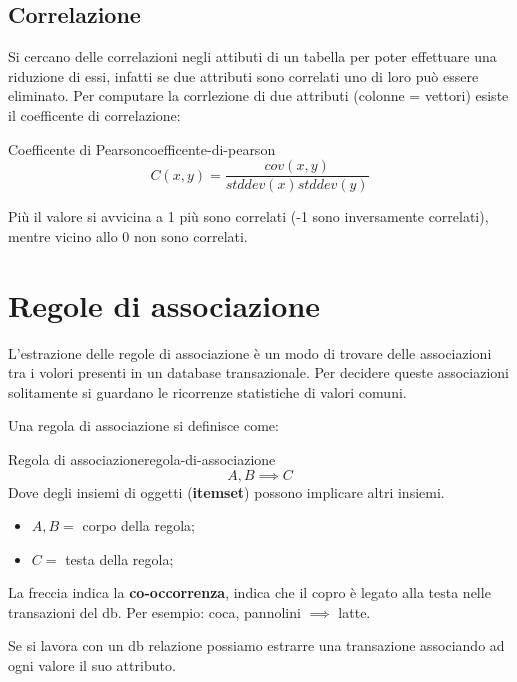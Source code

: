 \documentclass[12pt]{article}
\begin{document}
\subsection{Correlazione}
Si cercano delle correlazioni negli attibuti di un tabella per poter effettuare una riduzione di essi, infatti se due attributi sono correlati uno di loro pu\`o essere eliminato. Per computare la corrlezione di due attributi (colonne = vettori) esiste il coefficente di correlazione:
\begin{definition}{Coefficente di Pearson}{coefficente-di-pearson}
    \[ C(x, y) = \frac{cov(x, y)}{stddev(x) stddev(y)} \]
\end{definition}
Pi\`u il valore si avvicina a 1 pi\`u sono correlati (-1 sono inversamente correlati), mentre vicino allo 0 non sono correlati.


\newpage
\section{Regole di associazione}
L'estrazione delle regole di associazione \`e un modo di trovare delle associazioni tra i volori presenti in un database transazionale. Per decidere queste associazioni solitamente si guardano le ricorrenze statistiche di valori comuni.

Una regola di associazione si definisce come:
\begin{definition}{Regola di associazione}{regola-di-associazione}
    \[ A, B \implies C \]
    Dove degli insiemi di oggetti (\textbf{itemset}) possono implicare altri insiemi.
    \begin{itemize}
        \item $A, B =$ corpo della regola;
        \item $C =$ testa della regola;
    \end{itemize}
    La freccia indica la \textbf{co-occorrenza}, indica che il copro \`e legato alla testa nelle transazioni del db. Per esempio: coca, pannolini $ \implies $ latte.
\end{definition}

Se si lavora con un db relazione possiamo estrarre una transazione associando ad ogni valore il suo attributo.
\end{document}
